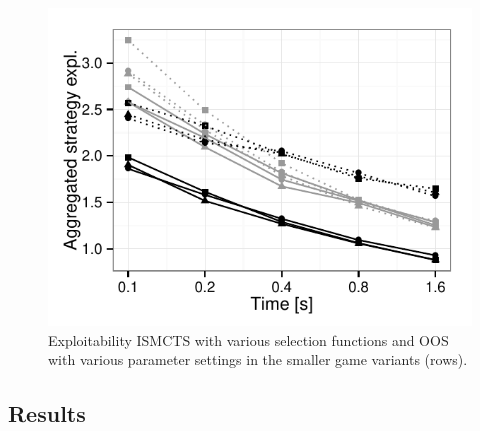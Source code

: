 \documentclass{aamas2015}
\begin{document}
\begin{figure}[t]
{\begin{minipage}{0.235\textwidth}
\includegraphics[width=\textwidth]{fig/agg_OSS-IST-WC_convergence-GP_2_2_3_3}
\end{minipage}}

\caption{Exploitability ISMCTS with various selection functions and OOS with various parameter settings in the smaller game variants (rows). }\label{fig:small}
\end{figure}

\subsection{Results}
\end{document}
